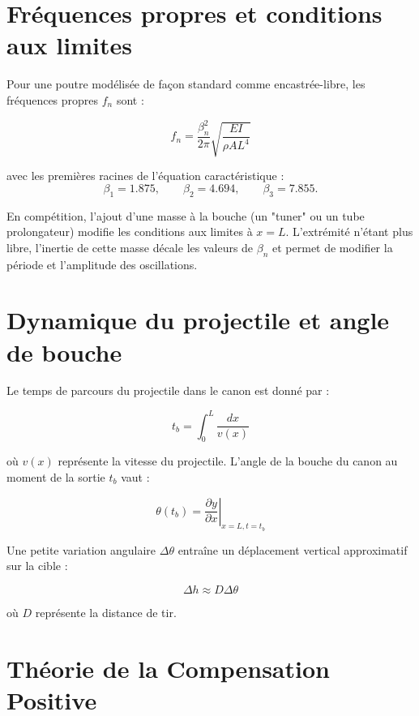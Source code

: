 \documentclass[11pt,a4paper]{article}
\begin{document}
	\section{Fréquences propres et conditions aux limites}
	
	Pour une poutre modélisée de façon standard comme encastrée-libre, les fréquences propres $f_n$ sont :
	
	\begin{equation}
		f_n = \frac{\beta_n^2}{2\pi} \sqrt{\frac{EI}{\rho A L^4}}
	\end{equation}
	
	avec les premières racines de l'équation caractéristique :
	\[
	\beta_1 = 1.875, \qquad \beta_2 = 4.694, \qquad \beta_3 = 7.855.
	\]
	
	En compétition, l'ajout d'une masse à la bouche (un "tuner" ou un tube prolongateur) modifie les conditions aux limites à $x=L$. L'extrémité n'étant plus libre, l'inertie de cette masse décale les valeurs de $\beta_n$ et permet de modifier la période et l'amplitude des oscillations.

	\section{Dynamique du projectile et angle de bouche}
	
	Le temps de parcours du projectile dans le canon est donné par :
	
	\begin{equation}
		t_b = \int_0^L \frac{dx}{v(x)}
	\end{equation}
	
	où $v(x)$ représente la vitesse du projectile. L'angle de la bouche du canon au moment de la sortie $t_b$ vaut :
	
	\begin{equation}
		\theta(t_b) = \left. \frac{\partial y}{\partial x} \right|_{x=L, t=t_b}
	\end{equation}
	
	Une petite variation angulaire $\Delta\theta$ entraîne un déplacement vertical approximatif sur la cible :
	
	\begin{equation}
		\Delta h \approx D \Delta\theta
	\end{equation}
	
	où $D$ représente la distance de tir.
	
	\section{Théorie de la Compensation Positive}
	
\end{document}
